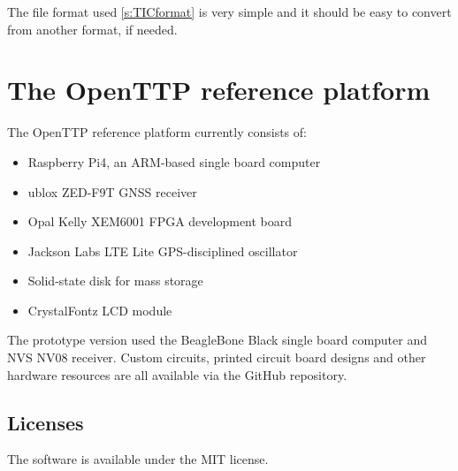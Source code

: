 The file format used \ref{s:TICformat} is very simple and it should be easy to convert from another format, if needed.
	
\section{The OpenTTP reference platform}

The OpenTTP reference platform currently consists of:
\begin{itemize}
\item Raspberry Pi4, an ARM-based single board computer
\item ublox ZED-F9T GNSS receiver
\item Opal Kelly XEM6001 FPGA development board
\item Jackson Labs LTE Lite GPS-disciplined oscillator
\item Solid-state disk for mass storage
\item CrystalFontz LCD module
\end{itemize}

The prototype version used the BeagleBone Black single board computer and NVS NV08 receiver.
Custom circuits, printed circuit board designs and other hardware resources are all available via the GitHub repository.

\subsection{Licenses}

The software is available under the MIT license.
